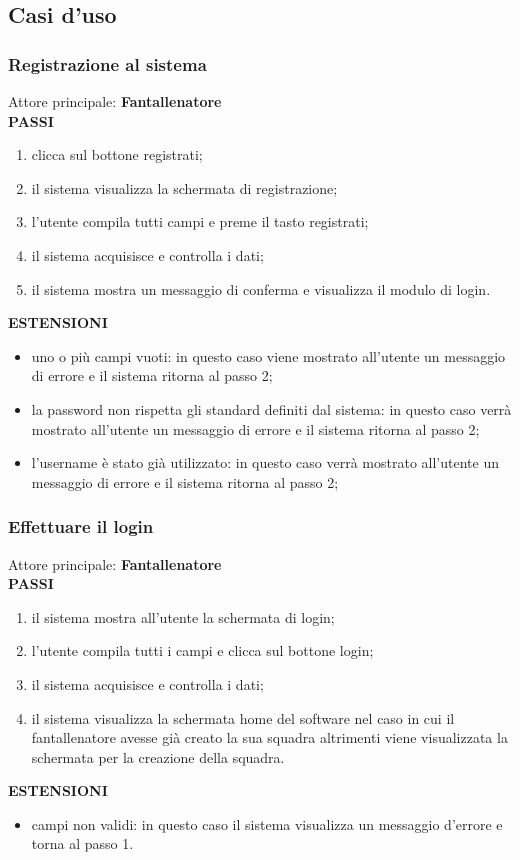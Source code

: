 \documentclass[12pt,a4paper]{article}
\begin{document}
\subsection{Casi d'uso}
\subsubsection{Registrazione al sistema}
Attore principale: \textbf{Fantallenatore}\\
\newline
\textbf{PASSI}
\begin{enumerate}
\item clicca sul bottone registrati;
\item il sistema visualizza la schermata di registrazione;
\item l'utente compila tutti campi e preme il tasto registrati;
\item il sistema acquisisce e controlla i dati;
\item il sistema mostra un messaggio di conferma e visualizza il modulo di login.
\end{enumerate}
\textbf{ESTENSIONI}
\begin{itemize}
\item uno o più campi vuoti: in questo caso viene mostrato all'utente un messaggio di errore e il sistema ritorna al passo 2;
\item la password non rispetta gli standard definiti dal sistema: in questo caso verrà mostrato all'utente un messaggio di errore e il sistema ritorna al passo 2;
\item l'username è stato già utilizzato: in questo caso verrà mostrato all'utente un messaggio di errore e il sistema ritorna al passo 2;
\end{itemize}
\subsubsection{Effettuare il login}
Attore principale: \textbf{Fantallenatore}\\
\newline
\textbf{PASSI}
\begin{enumerate}
\item il sistema mostra all'utente la schermata di login;
\item l'utente compila tutti i campi e clicca sul bottone login;
\item il sistema acquisisce e controlla i dati;
\item il sistema visualizza la schermata home del software nel caso in cui il fantallenatore avesse già creato la sua squadra altrimenti viene visualizzata la schermata per la creazione della squadra.
\end{enumerate}
\textbf{ESTENSIONI}
\begin{itemize}
\item campi non validi: in questo caso il sistema visualizza un messaggio d'errore e torna al passo 1.
\end{itemize}
\end{document}
